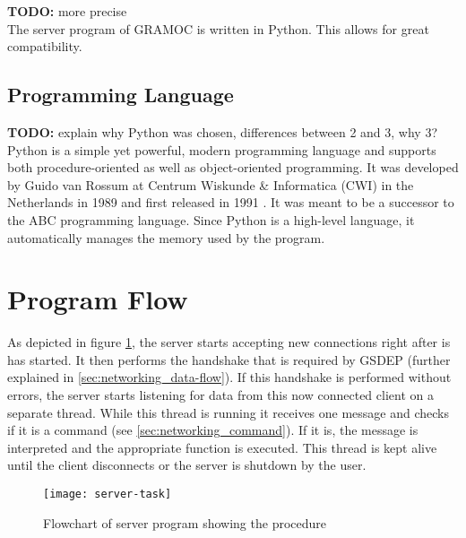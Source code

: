 \textbf{TODO:} more precise \\
The server program of GRAMOC is written in Python. This allows for great compatibility.

\subsection{Programming Language}

\textbf{TODO:} explain why Python was chosen, differences between 2 and 3, why 3? \\
Python is a simple yet powerful, modern programming language and supports both procedure-oriented as well as object-oriented programming. It was developed by Guido van Rossum at Centrum Wiskunde \& Informatica (CWI) in the Netherlands in 1989 and first released in 1991 \cite{HistoryOfPython}. It was meant to be a successor to the ABC programming language. Since Python is a high-level language, it automatically manages the memory used by the program.

\section{Program Flow}

As depicted in figure \ref{fig:server-program-flow}, the server starts accepting new connections right after is has started. It then performs the handshake that is required by GSDEP (further explained in \ref{sec:networking_data-flow}). If this handshake is performed without errors, the server starts listening for data from this now connected client on a separate thread. While this thread is running it receives one message and checks if it is a command (see \ref{sec:networking_command}). If it is, the message is interpreted and the appropriate function is executed. This thread is kept alive until the client disconnects or the server is shutdown by the user.

\begin{figure}[H]
	\centering
	\texttt{[image: server-task]}
	\caption{Flowchart of server program showing the procedure}
	\label{fig:server-program-flow}
\end{figure}
